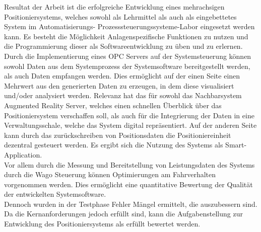 \documentclass[../../Bachelorarbeit.tex]{subfiles}
\begin{document}
\smallskip \newline
Resultat der Arbeit ist die erfolgreiche Entwicklung eines mehrachsigen Positioniersystems, welches sowohl als Lehrmittel als auch als eingebettetes System im Automatisierungs- \bzw Prozesssteuerungssysteme-Labor eingesetzt werden kann. Es besteht die Möglichkeit Anlagenspezifische Funktionen zu nutzen und die Programmierung dieser als Softwareentwicklung zu üben und zu erlernen. Durch die Implementierung eines OPC Servers auf der Systemsteuerung können sowohl Daten aus dem Systemprozess \bzw der Systemsoftware bereitgestellt werden, als auch Daten empfangen werden. Dies ermöglicht auf der einen Seite einen Mehrwert aus den generierten Daten zu erzeugen, in dem diese visualisiert und/oder analysiert werden. Relevanz hat das für sowohl das Nachbarsystem Augmented Reality Server, welches einen schnellen Überblick über das Positioniersystem verschaffen soll, als auch für die Integrierung der Daten in eine Verwaltungsschale, welche das System digital repräsentiert. Auf der anderen Seite kann durch das zurückschreiben von \zB Positionsdaten die Positioniereinheit dezentral gesteuert werden. Es ergibt sich die Nutzung des Systems als Smart-Application. \\
Vor allem durch die Messung und Bereitstellung von Leistungsdaten des Systems durch die Wago Steuerung können Optimierungen am Fahrverhalten vorgenommen werden. Dies ermöglicht eine quantitative Bewertung der Qualität der entwickelten Systemsoftware.\\
Dennoch wurden in der Testphase Fehler \bzw Mängel ermittelt, die auszubessern sind. Da die Kernanforderungen jedoch erfüllt sind, kann die Aufgabenstellung zur Entwicklung des Positioniersystems als erfüllt bewertet werden. 
\end{document}
